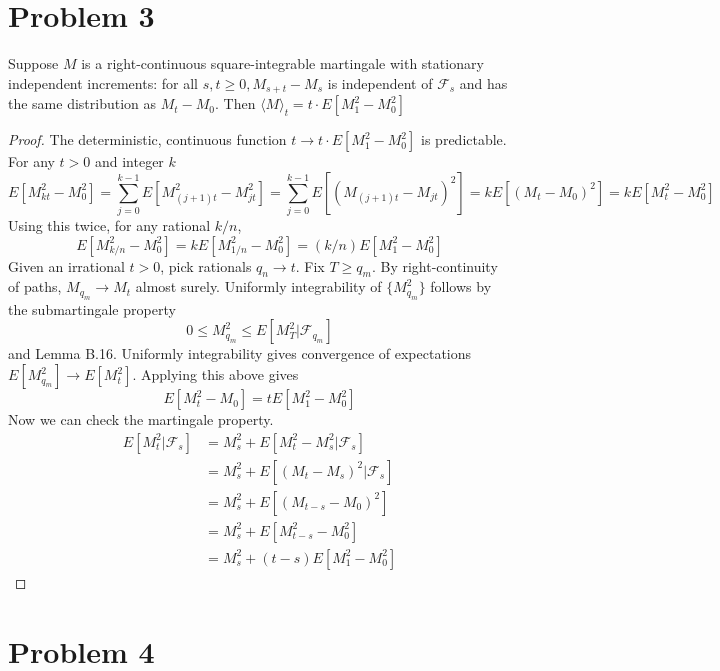 \documentclass{article}
\begin{document}
\section*{Problem 3}
Suppose $M$ is a right-continuous square-integrable martingale with stationary independent increments: for all $s, t \geqslant 0, M_{s+t}-M_s$ is independent of $\mathcal{F}_s$ and has the same distribution as $M_t-M_0$. Then $\langle M \rangle_t = t \cdot E[M_1^2 - M_0^2] $
\begin{proof}
	The deterministic, continuous function $t \to t \cdot E[M_1^2 - M_0^2]$ is predictable. For any $t>0$ and integer $k$
	$$E[M_{kt}^2 - M_0^2] = \sum_{j=0}^{k-1}E[M_{(j+1)t}^2 - M_{jt}^2] = \sum_{j=0}^{k-1}E[(M_{(j+1)t} - M_{jt})^2] = kE[(M_t - M_0)^2] = kE[M_t^2 - M_0^2]$$
	Using this twice, for any rational $k/n$,
	$$E[M_{k/n}^2 - M_0^2] = kE[M_{1/n}^2 - M_0^2] = (k/n)E[M_1^2 - M_0^2]$$
	Given an irrational $t>0$, pick rationals $q_n \to t$. Fix $T\geqslant q_m$. By right-continuity of paths, $M_{q_m} \to M_{t}$ almost surely. Uniformly integrability of $\{M_{q_m}^2\}$ follows by the submartingale property
	$$0\leqslant M_{q_m}^2 \leqslant E[M_{T}^2|\mathcal{F}_{q_m}]$$
	and Lemma B.16. Uniformly integrability gives convergence of expectations $E[M_{q_m}^2] \to E[M_{t}^2]$. Applying this above gives $$E[M_t^2 - M_0] = tE[M_1^2-M_0^2]$$
	Now we can check the martingale property.\begin{align*}
		E[M_t^2|\mathcal{F}_{s}] &= M_s^2+E[M_t^2-M_s^2|\mathcal{F}_{s}]\\
		& = M_s^2 + E[(M_t-M_s)^2|\mathcal{F}_s]\\
		& = M_s^2 + E[(M_{t-s} - M_0)^2]\\
		& = M_s^2 + E[M_{t-s}^2 - M_0^2]\\
		& = M_s^2 + (t-s)E[M_1^2-M_0^2]
	\end{align*}
\end{proof}

\section*{Problem 4}
\end{document}
